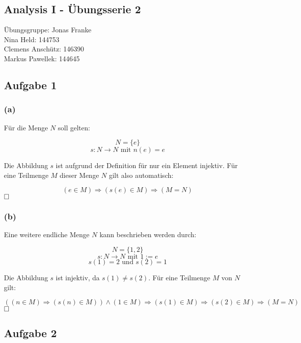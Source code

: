 \documentclass[11pt, a4paper]{article}
\begin{document}
	\begin{center}\section*{Analysis I - Übungsserie 2}\end{center}

	Übungsgruppe: Jonas Franke \\


	Nina Held: 144753 \\
	Clemens Anschütz: 146390 \\
	Markus Pawellek: 144645 \\


	\subsection*{Aufgabe 1}

	\subsubsection*{(a)}

		Für die Menge $N$ soll gelten:

		\[ N = \{ e \} \]
		\[ s:N \longrightarrow N \text{  mit  } n(e) = e \]

		Die Abbildung $s$ ist aufgrund der Definition für nur ein Element injektiv. Für eine Teilmenge $M$ dieser Menge $N$ gilt also automatisch:

		\[ (e \in M) \Rightarrow (s(e) \in M) \Rightarrow (M = N) \] $\hfill \Box$

		
	\subsubsection*{(b)}

		Eine weitere endliche Menge $N$ kann beschrieben werden durch:

		\[ N = \{1,2\} \]
		\[ s:N \longrightarrow N \text{  mit  } 1:=e \]
		\[ s(1) = 2 \text{  und  } s(2) = 1 \]

		Die Abbildung $s$ ist injektiv, da $s(1) \neq s(2)$. Für eine Teilmenge $M$ von $N$ gilt:

		\[ \left( (n \in M) \Rightarrow (s(n) \in M) \right) \wedge (1 \in M) \Rightarrow (s(1) \in M) \Rightarrow (s(2) \in M) \Rightarrow (M=N) \] $\hfill \Box$


	\subsection*{Aufgabe 2}
\end{document}
